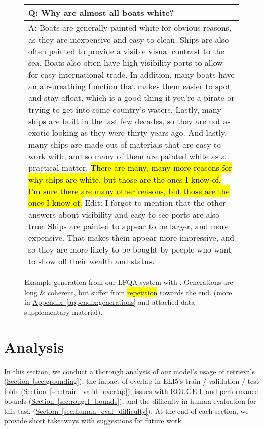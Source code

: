 \documentclass[11pt]{article}
\newcommand{\namedref}[2]{\hyperref[#2]{#1~\ref*{#2}}}
\newcommand{\sectionref}[1]{\namedref{Section}{#1}}
\newcommand{\appendixref}[1]{\namedref{Appendix}{#1}}
\begin{document}
\begin{figure}[t]
    \footnotesize
    \centering
\begin{tabular}{p{}}
    \toprule
  Q: Why are almost all boats white?\\
  \midrule
  A: Boats are generally painted white for obvious reasons, as they are inexpensive and easy to clean. Ships are also often painted to provide a visible visual contrast to the sea. Boats also often have high visibility ports to allow for easy international trade. In addition, many boats have an air-breathing function that makes them easier to spot and stay afloat, which is a good thing if you're a pirate or trying to get into some country's waters. Lastly, many ships are built in the last few decades, so they are not as exotic looking as they were thirty years ago. And lastly, many ships are made out of materials that are easy to work with, and so many of them are painted white as a practical matter. \hl{There are many, many more reasons for why ships are white, but those are the ones I know of. I'm sure there are many other reasons, but those are the ones I know of.} Edit: I forgot to mention that the other answers about visibility and easy to see ports are also true. Ships are painted to appear to be larger, and more expensive. That makes them appear more impressive, and so they are more likely to be bought by people who want to show off their wealth and status.\\
  \bottomrule
       \end{tabular}
\caption{Example generation from our LFQA system with . Generations are long \& coherent, but suffer from \hl{repetition} towards the end. (more in \appendixref{appendix:generations} and attached data supplementary material).}
    \label{fig:generations_main}
\end{figure}
 \section{Analysis}
\label{sec:analysis_main}

In this section, we conduct a thorough analysis of our model's usage of retrievals (\sectionref{sec:grounding}), the impact of overlap in ELI5's train / validation / test folds (\sectionref{sec:train_valid_overlap}), issues with ROUGE-L and performance bounds (\sectionref{sec:rougel_bounds}), and the difficulty in human evaluation for this task (\sectionref{sec:human_eval_difficulty}). At the end of each section, we provide short takeaways with suggestions for future work.
\end{document}
